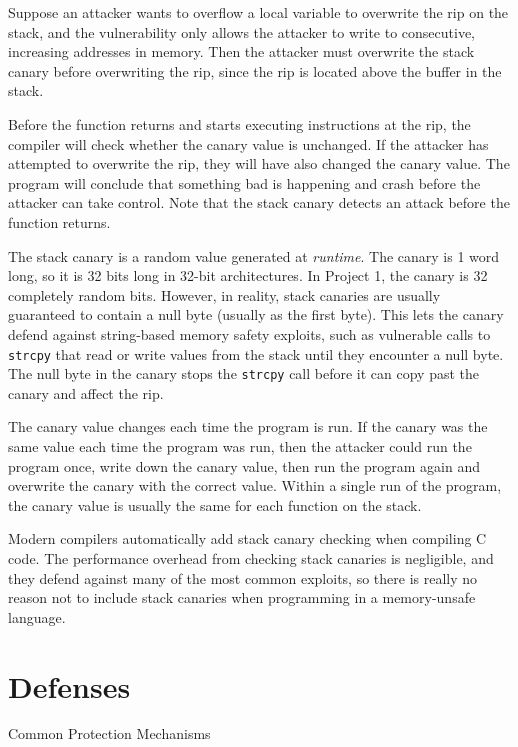 \documentclass[a4paper]{exam}
\theoremstyle{definition}
\begin{document}
Suppose an attacker wants to overflow a local variable to overwrite the
rip on the stack, and the vulnerability only allows the attacker to
write to consecutive, increasing addresses in memory. Then the attacker
must overwrite the stack canary before overwriting the rip, since the
rip is located above the buffer in the stack.

Before the function returns and starts executing instructions at the
rip, the compiler will check whether the canary value is unchanged. If
the attacker has attempted to overwrite the rip, they will have also
changed the canary value. The program will conclude that something bad
is happening and crash before the attacker can take control. Note that
the stack canary detects an attack before the function returns.

The stack canary is a random value generated at \emph{runtime}. The
canary is 1 word long, so it is 32 bits long in 32-bit architectures. In
Project 1, the canary is 32 completely random bits. However, in reality,
stack canaries are usually guaranteed to contain a null byte (usually as
the first byte). This lets the canary defend against string-based memory
safety exploits, such as vulnerable calls to \texttt{strcpy} that read
or write values from the stack until they encounter a null byte. The
null byte in the canary stops the \texttt{strcpy} call before it can
copy past the canary and affect the rip.

The canary value changes each time the program is run. If the canary was
the same value each time the program was run, then the attacker could
run the program once, write down the canary value, then run the program
again and overwrite the canary with the correct value. Within a single
run of the program, the canary value is usually the same for each
function on the stack.

Modern compilers automatically add stack canary checking when compiling
C code. The performance overhead from checking stack canaries is
negligible, and they defend against many of the most common exploits, so
there is really no reason not to include stack canaries when programming
in a memory-unsafe language.

\section{Defenses}
Common Protection Mechanisms
\end{document}
